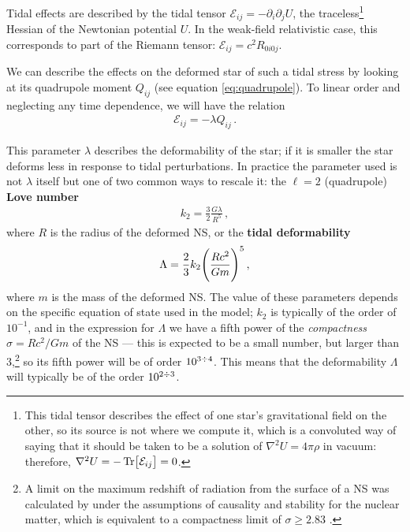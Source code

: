 \documentclass[main.tex]{subfiles}
\begin{document}
Tidal effects are described by the tidal tensor \(\mathcal{E}_{ij} = - \partial_{i} \partial_{j} U\), the traceless\footnote{This tidal tensor describes the effect of one star's gravitational field on the other, so its source is not where we compute it, which is a convoluted way of saying that it should be taken to be a solution of \(\nabla^2 U = 4 \pi \rho \) in vacuum: therefore, \(\nabla^2 U = - \Tr[\mathcal{E}_{ij}] = 0\).} Hessian of the Newtonian potential \(U\). In the weak-field relativistic case, this corresponds to part of the Riemann tensor: \(\mathcal{E}_{ij} = c^2R_{0i0j}\). 

We can describe the effects on the deformed star of such a tidal stress by looking at its quadrupole moment \(Q_{ij}\) (see equation \eqref{eq:quadrupole}).
To linear order and neglecting any time dependence, we will have the relation 
%
\begin{align}
\mathcal{E}_{ij} = - \lambda Q_{ij}
\,.
\end{align}


This parameter \(\lambda \) describes the deformability of the star; if it is smaller the star deforms less in response to tidal perturbations. 
In practice the parameter used is not \(\lambda \) itself but one of two common ways to rescale it: the \(\ell=2\) (quadrupole) \textbf{Love number} 
%
\begin{align}
k_2 = \frac{3}{2} \frac{G \lambda }{R^{5}}
\,,
\end{align}
%
where \(R\) is the radius of the deformed \ac{NS}, or the \textbf{tidal deformability} 
%
\begin{align}
\Lambda = \frac{2}{3} k_2 \qty(\frac{Rc^2}{Gm})^{5} 
\,,
\end{align}
%
where \(m\) is the mass of the deformed \ac{NS}. 
The value of these parameters depends on the specific equation of state used in the model; \(k_2\) is typically of the order of \(10^{-1}\), and in the expression for \(\Lambda \) we have a fifth power of the \emph{compactness} \(\sigma = R c^2 / Gm\) of the \ac{NS} --- this is expected to be a small number, but larger than 3,\footnote{A limit on the maximum redshift of radiation from the surface of a \ac{NS} was calculated by \textcite{lindblomLimitsGravitationalRedshift1984} under the assumptions of causality and stability for the nuclear matter, which is equivalent to a compactness limit of \(\sigma \geq 2.83\) \cite{lattimerNeutronStarObservations2007}. } so its fifth power will be of order \(10^{3 \divisionsymbol 4}\). This means that the deformability \(\Lambda \) will typically be of the order \(10^{2 \divisionsymbol 3}\). 
\end{document}
